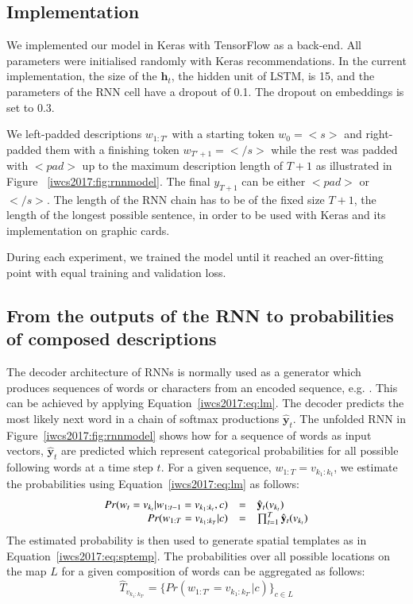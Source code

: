 \subsection{Implementation}

We implemented our model in Keras \cite{chollet2015keras} with TensorFlow
\cite{tensorflow2015-whitepaper} as a back-end. All parameters were initialised
randomly with Keras recommendations. In the current implementation, the size of
the $\mathbf{h}_t$, the hidden unit of LSTM, is 15, and the parameters of the
RNN cell have a dropout of 0.1. The dropout on embeddings is set to 0.3.

We left-padded descriptions $w_{1:T'}$ with a starting token $w_0 = <s>$ and
right-padded them with a finishing token $w_{T'+1}=</s>$ while the rest was
padded with $<pad>$ up to the maximum description length of $T+1$ as illustrated in
Figure ~\ref{iwcs2017:fig:rnnmodel}. The final $y_{T+1}$ can be either $<pad>$ or $</s>$.
The length of the RNN chain has to be of the fixed size $T+1$, the length of the
longest possible sentence, in order to be used with Keras and its implementation
on graphic cards.

During each experiment, we trained the model until it reached an over-fitting
point with equal training and validation loss.

\subsection{From the outputs of the RNN to probabilities of composed descriptions}

The decoder architecture of RNNs is normally used as a generator which produces
sequences of words or characters from an encoded sequence, e.g.
\cite{cho2014learning,graves2013generating}. This can be achieved by applying 
Equation~\ref{iwcs2017:eq:lm}. The decoder predicts the most likely next word in a chain of
softmax productions $\hat{\mathbf{y}}_t$.  The unfolded RNN in Figure~\ref{iwcs2017:fig:rnnmodel} shows how for a sequence of words as input vectors,
$\hat{\mathbf{y}}_t$ are predicted which represent categorical probabilities for all
possible following words at a time step $t$. For a given sequence, $w_{1:T} =
v_{k_1:k_t}$, we estimate the probabilities using Equation~\ref{iwcs2017:eq:lm} 
as follows:
\begin{equation}\begin{array}{r c l}
	Pr(w_t=v_{k_t}|w_{1:t-1}=v_{k_1:k_t}, c) &=& \hat{\mathbf{y}}_t(v_{k_t}) \\
Pr(w_{1:T}=v_{k_1:k_T} | c) &=& \prod_{t=1}^{T}{\hat{\mathbf{y}}_t(v_{k_t})} \\
\end{array}
\end{equation}
\noindent The estimated probability is then used to generate spatial templates as in
Equation~\ref{iwcs2017:eq:sptemp}. The probabilities over all possible
locations on the map $L$ for a given composition of words can be aggregated as follows:
\begin{equation}
\hat{T}_{v_{k_1:k_{T'}}} = \{Pr(w_{1:{T'}}=v_{k_1:k_{T'}} | c)\}_{c \in L}
\end{equation}

